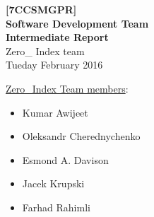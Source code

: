 \begin{titlepage}
    \begin{center}
        \vspace*{6cm}
        \noindent\makebox[\linewidth]{\rule{\paperwidth}{0.4pt}}
        \Huge
        \textbf{[7CCSMGPR]\\Software Development Team\\}
        \vspace{0.5cm}
        \Large
        \textbf{Intermediate Report\\}
        \vspace{1.5cm}
        \large
        \textsf{Zero\_ Index team\\}
        \vspace{1cm}
        \textsf{Tueday  February 2016}
        \noindent\makebox[\linewidth]{\rule{\paperwidth}{0.4pt}}
        \vfill
	\end{center}
	\vspace{1cm}
	\underline{\textsf{Zero\_Index Team members}}:
	\begin{itemize}
		\item Kumar Awijeet
		\item Oleksandr Cherednychenko
		\item Esmond A. Davison
		\item Jacek Krupski
		\item Farhad Rahimli
	\end{itemize}
\end{titlepage}



